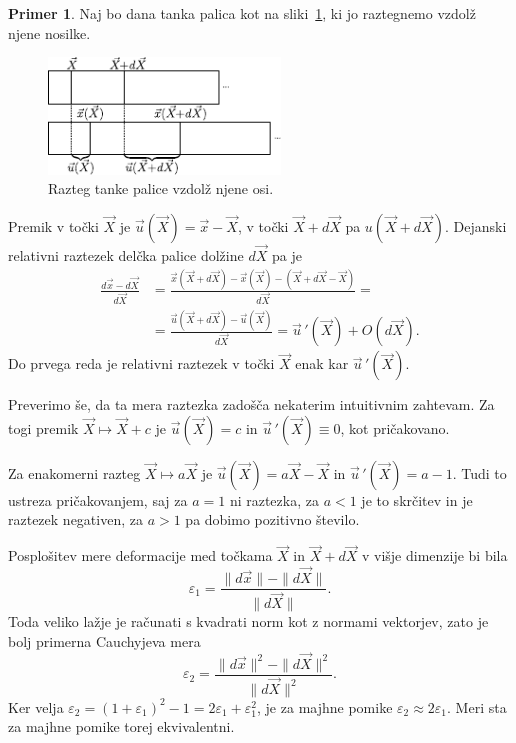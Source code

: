 \documentclass[12pt,a4paper,twoside]{article}
\theoremstyle{definition} %
\newtheorem{primer}[definicija]{Primer}
\theoremstyle{plain} %
\numberwithin{equation}{section}
\newcommand{\eps}{\varepsilon}
\newcommand{\vu}{\vec{u}}
\newcommand{\vX}{\vec{X}}
\newcommand{\vx}{\vec{x}}
\begin{document}
\begin{primer}
Naj bo dana tanka palica kot na sliki~\ref{fig:palica}, ki jo raztegnemo vzdolž
njene nosilke.
\begin{figure}[h]
  \centering
  \includegraphics[width=0.55\textwidth]{images/stretch1d.pdf}
  \caption{Razteg tanke palice vzdolž njene osi.}
  \label{fig:palica}
\end{figure}
Premik v točki $\vX$ je $\vu(\vX) = \vx - \vX$, v točki $\vX+d\vX$ pa $u(\vX+d\vX)$.
Dejanski relativni raztezek delčka palice dolžine $d\vX$ pa je
\begin{align}
  \frac{d\vx - d\vX}{d\vX} &= \frac{\vx(\vX+d\vX) - \vx(\vX) - (\vX + d\vX - \vX)}{d\vX} = \nonumber \\ &=
  \frac{\vu(\vX + d\vX) - \vu(\vX)}{d\vX} = \vu\,'(\vX) + O(d\vX).
\end{align}
Do prvega reda je relativni raztezek v točki $\vX$ enak kar $\vu\,'(\vX)$.

Preverimo še, da ta mera raztezka zadošča nekaterim intuitivnim zahtevam. Za
togi premik $\vX \mapsto \vX + c$ je $\vu(\vX) = c$ in $\vu\,'(\vX) \equiv 0$, kot
pričakovano.

Za enakomerni razteg $\vX \mapsto a\vX$ je $\vu(\vX) = a\vX - \vX$ in $\vu\,'(\vX) = a - 1$. Tudi
to ustreza pričakovanjem, saj za $a = 1$ ni raztezka, za $a< 1$ je to skrčitev
in je raztezek negativen, za $a>1$ pa dobimo pozitivno število.
\end{primer}

Posplošitev mere deformacije med točkama $\vX$ in $\vX+d\vX$ v višje dimenzije bi bila
\begin{equation}
   \eps_1 = \frac{\|d\vx\| - \|d\vX\|}{\|d\vX\|}.
\end{equation}
Toda veliko lažje je računati s kvadrati norm kot z normami vektorjev, zato je
bolj primerna Cauchyjeva mera
\begin{equation}
  \eps_2 = \frac{\|d\vx\|^2 - \|d\vX\|^2}{\|d\vX\|^2}.
\end{equation}
Ker velja $\eps_2 = (1+\eps_1)^2 - 1 = 2\eps_1 + \eps_1^2$, je za majhne pomike
$\eps_2 \approx 2\eps_1$. Meri sta za majhne pomike torej ekvivalentni.
\end{document}
